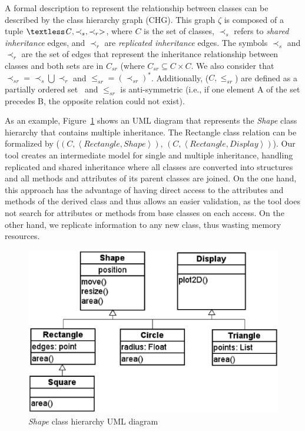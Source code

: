 \documentclass[a4paper]{llncs}
\begin{document}
A formal description to represent
the relationship between classes can be described by the class hierarchy graph
(CHG). This graph $\zeta$ is composed of a tuple $\textless \mathit{C}, \prec_{s}, \prec_{r}>$,
where $\mathit{C}$ is the set of classes, $\prec_s $ refers to \textit{shared inheritance} edges,
and $\prec_r$ are \textit{replicated inheritance} edges. The symbols $\prec_{s}$ and $\prec_{r}$
are the set of edges that represent the inheritance relationship between
classes and both sets are in $\mathit{C_{sr}}$ (where $\mathit{C_{sr}} \subseteq \mathit{C} \times \mathit{C}$.
We also consider that $\prec_{sr} = \prec_s \bigcup \prec_r$ and $\leq_{sr} = (\prec_{sr})^*$.
Additionally, ($\mathit{C}, \leq_{sr}$) are defined as a partially ordered set~\cite{Neggers99}
and $\leq_{sr}$ is anti-symmetric (i.e., if one element A of the set precedes B,
the opposite relation could not exist).

As an example, Figure~\ref{figure:uml_diagram} shows an UML diagram
that represents the \textit{Shape} class hierarchy that contains multiple inheritance.
The Rectangle class relation can be formalized by
($\left(C, \left\langle Rectangle, Shape \right\rangle \right)$,
$\left(C, \left\langle Rectangle, Display \right\rangle \right)$).
Our tool creates an intermediate model for single and multiple inheritance, handling
replicated and shared inheritance where all classes are converted into structures and all
methods and attributes of its parent classes are joined. On the one hand, this approach has
the advantage of having direct access to the attributes and methods
of the derived class and thus allows an easier validation, as the tool
does not search for attributes or methods from base classes on each access.
On the other hand, we replicate information to any new class, thus wasting
memory resources.

\vspace*{-4ex}

\begin{figure}[ht]
\centering
\includegraphics[scale=0.27]{figures/inheritance_uml}
\caption{\textit{Shape} class hierarchy UML diagram} \vspace*{-4ex}
\label{figure:uml_diagram}
\end{figure}
\end{document}

